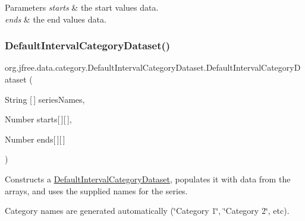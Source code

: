 \begin{DoxyParams}{Parameters}
{\em starts} & the start values data. \\
\hline
{\em ends} & the end values data. \\
\hline
\end{DoxyParams}
\mbox{\label{classorg_1_1jfree_1_1data_1_1category_1_1_default_interval_category_dataset_a3057d475ae9675290e58db33d37ae4ce}} 
\subsubsection{\texorpdfstring{Default\+Interval\+Category\+Dataset()}{DefaultIntervalCategoryDataset()}\hspace{0.1cm}{\footnotesize\ttfamily [3/4]}}
{\footnotesize\ttfamily org.\+jfree.\+data.\+category.\+Default\+Interval\+Category\+Dataset.\+Default\+Interval\+Category\+Dataset (\begin{DoxyParamCaption}\item[{String \mbox{[}$\,$\mbox{]}}]{series\+Names,  }\item[{Number}]{starts\mbox{[}$\,$\mbox{]}\mbox{[}$\,$\mbox{]},  }\item[{Number}]{ends\mbox{[}$\,$\mbox{]}\mbox{[}$\,$\mbox{]} }\end{DoxyParamCaption})}

Constructs a \mbox{\hyperlink{classorg_1_1jfree_1_1data_1_1category_1_1_default_interval_category_dataset}{Default\+Interval\+Category\+Dataset}}, populates it with data from the arrays, and uses the supplied names for the series. 

Category names are generated automatically (\char`\"{}\+Category 1\char`\"{}, \char`\"{}\+Category 2\char`\"{}, etc).


